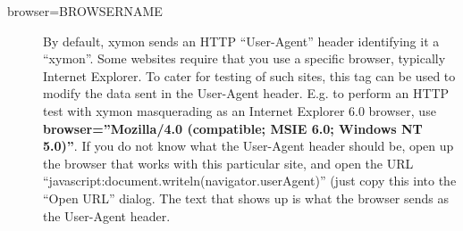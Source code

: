 \begin{description}
 

\item[browser=BROWSERNAME] By default, xymon sends an HTTP
  ``User-Agent'' header identifying it a ``xymon''. Some websites
  require that you use a specific browser, typically Internet
  Explorer. To cater for testing of such sites, this tag can be used
  to modify the data sent in the User-Agent header.   E.g. to perform
  an HTTP test with xymon masquerading as an Internet Explorer 6.0
  browser, use \textbf{browser=''Mozilla/4.0 (compatible; MSIE 6.0;
    Windows NT 5.0)''}. If you do not know what the User-Agent header
  should be, open up the browser that works with this particular site,
  and open the URL
  ``javascript:document.writeln(navigator.userAgent)'' (just copy this
  into the ``Open URL'' dialog. The text that shows up is what the
  browser sends as the User-Agent header. 


 


\end{description}

